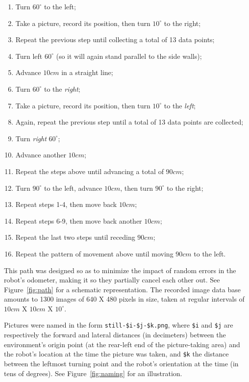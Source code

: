 \documentclass[twocolumn, 9pt]{jsproceedings}
\begin{document}
\begin{enumerate}
\item Turn \(60^{\circ}\) to the left;
\item Take a picture, record its position, then turn \(10^{\circ}\) to the right;
\item Repeat the previous step until collecting a total of 13 data points;
\item Turn left \(60^{\circ}\) (so it will again stand parallel to the side walls);
\item Advance \(10cm\) in a straight line;
\item Turn \(60^{\circ}\) to the {\it right};
\item Take a picture, record its position, then turn \(10^{\circ}\) to the {\it left};
\item Again, repeat the previous step until a total of 13 data points are collected;
\item Turn {\it right} \(60^{\circ}\);
\item Advance another \(10cm\);
\item Repeat the steps above until advancing a total of \(90cm\);
\item Turn \(90^{\circ}\) to the left, advance \(10cm\), then turn \(90^{\circ}\) to the right;
\item Repeat steps 1-4, then move back \(10cm\);
\item Repeat steps 6-9, then move back another \(10cm\);
\item Repeat the last two steps until receding \(90cm\);
\item Repeat the pattern of movement above until moving \(90cm\) to the left.
\end{enumerate}

This path was designed so as to minimize the impact of random errors in the robot's odometer, making it so they partially cancel each other out. See Figure~\ref{fig:path} for a schematic representation. The recorded image data base amounts to 1300 images of 640 X 480 pixels in size, taken at regular intervals of \(10cm\) X \(10cm\) X \(10^{\circ}\).

Pictures were named in the form {\tt still-\$i-\$j-\$k.png}, where {\tt \$i} and {\tt \$j} are respectively the forward and lateral distances (in decimeters) between the environment's origin point (at the rear-left end of the picture-taking area) and the robot's location at the time the picture was taken, and {\tt \$k} the distance between the leftmost turning point and the robot's orientation at the time (in tens of degrees). See Figure~\ref{fig:naming} for an illustration.
\end{document}

